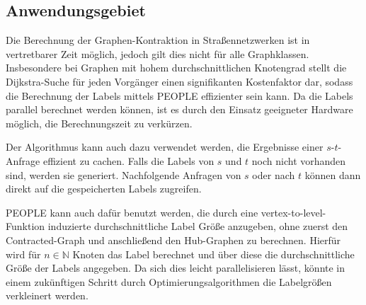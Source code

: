 \subsection{Anwendungsgebiet}

Die Berechnung der Graphen-Kontraktion in Straßennetzwerken ist in vertretbarer Zeit möglich, jedoch gilt dies nicht für alle Graphklassen.
Insbesondere bei Graphen mit hohem durchschnittlichen Knotengrad stellt die Dijkstra-Suche für jeden Vorgänger einen signifikanten Kostenfaktor dar, sodass die Berechnung der Labels mittels PEOPLE effizienter sein kann.
Da die Labels parallel berechnet werden können, ist es durch den Einsatz geeigneter Hardware möglich, die Berechnungszeit zu verkürzen.

Der Algorithmus kann auch dazu verwendet werden, die Ergebnisse einer $s$-$t$-Anfrage effizient zu cachen.
Falls die Labels von $s$ und $t$ noch nicht vorhanden sind, werden sie generiert.
Nachfolgende Anfragen von $s$ oder nach $t$ können dann direkt auf die gespeicherten Labels zugreifen.

PEOPLE kann auch dafür benutzt werden, die durch eine vertex-to-level-Funktion induzierte durchschnittliche Label Größe anzugeben, ohne zuerst den Contracted-Graph und anschließend den Hub-Graphen zu berechnen.
Hierfür wird für $n \in \mathbb{N}$ Knoten das Label berechnet und über diese die durchschnittliche Größe der Labels angegeben.
Da sich dies leicht parallelisieren lässt, könnte in einem zukünftigen Schritt durch Optimierungsalgorithmen die Labelgrößen verkleinert werden.